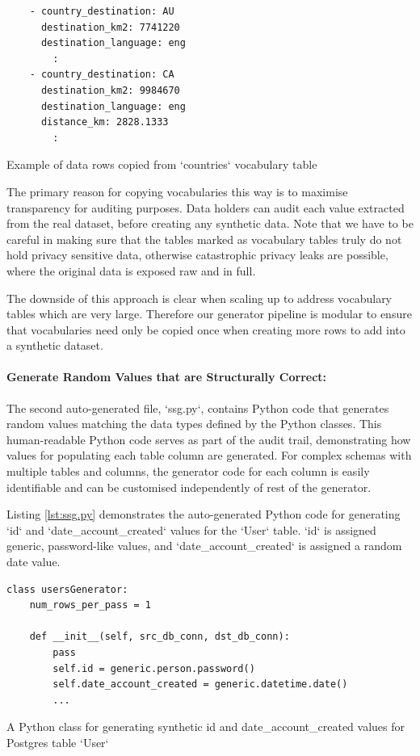 \documentclass[11pt]{article}
\begin{document}
\begin{listing}[H]
\begin{verbatim}
    - country_destination: AU
      destination_km2: 7741220
      destination_language: eng
        :
    - country_destination: CA
      destination_km2: 9984670
      destination_language: eng
      distance_km: 2828.1333
        :
\end{verbatim}
\caption{Example of data rows copied from `countries` vocabulary table}
\label{lst:countries.yaml}
\end{listing}

The primary reason for copying vocabularies this way is to maximise transparency for auditing purposes. Data holders can audit each value extracted from the real dataset, before creating any synthetic data. Note that we have to be careful in making sure that the tables marked as vocabulary tables truly do not hold privacy sensitive data, otherwise catastrophic privacy leaks are possible, where the original data is exposed raw and in full. 

The downside of this approach is clear when scaling up to address vocabulary tables which are very large. Therefore our generator pipeline is modular to ensure that vocabularies need only be copied once when creating more rows to add into a synthetic dataset. 

\paragraph{Generate Random Values that are Structurally Correct: }

The second auto-generated file, `ssg.py`, contains Python code that generates random values matching the data types defined by the Python classes. This human-readable Python code serves as part of the audit trail, demonstrating how values for populating each table column are generated. For complex schemas with multiple tables and columns, the generator code for each column is easily identifiable and can be customised independently of rest of the generator. 

Listing \ref{lst:ssg.py} demonstrates the auto-generated Python code for generating `id` and `date\_account\_created` values for the `User` table. `id` is assigned generic, password-like values, and `date\_account\_created` is assigned a random date value.

\begin{listing}[H]
\begin{verbatim}
class usersGenerator:
    num_rows_per_pass = 1

    def __init__(self, src_db_conn, dst_db_conn):
        pass
        self.id = generic.person.password()
        self.date_account_created = generic.datetime.date()
        ...
\end{verbatim}
\caption{A Python class for generating synthetic id and date\_account\_created values for Postgres table `User`}
\label{lst:ssg.py}
\end{listing}
\end{document}
